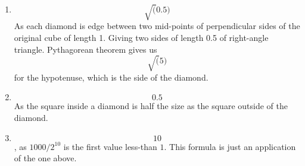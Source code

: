 \begin{enumerate}

\item $$\sqrt(0.5)$$ As each diamond is edge between two mid-points of perpendicular sides of the original cube of length 1. Giving two sides of length 0.5 of right-angle triangle. Pythagorean theorem gives us $$\sqrt(5)$$ for the hypotenuse, which is the side of the diamond. 

\item $$0.5$$ As the square inside a diamond is half the size as the square outside of the diamond.

\item $$10$$, as $1000/2^{10}$ is the first value less-than $1$. This formula is just an application of the one above.

\end{enumerate}
